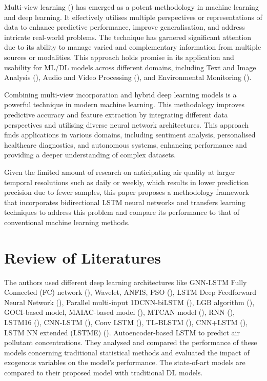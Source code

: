 \documentclass[a4paper, fleqn]{cas-sc}
\theoremstyle{definition}
\theoremstyle{remark}
\begin{document}
Multi-view learning (\cite{zhao2017multi, xu2013survey}) has emerged as a potent methodology in machine learning and deep learning. It effectively utilises multiple perspectives or representations of data to enhance predictive performance,  improve generalisation,  and address intricate real-world problems. The technique has garnered significant attention due to its ability to manage varied and complementary information from multiple sources or modalities. This approach holds promise in its application and usability for ML/DL models across different domains,  including Text and Image Analysis (\cite{yang2020image, nie2017auto}),  Audio and Video Processing (\cite{garcia2018multi, hussain2021comprehensive}),  and Environmental Monitoring (\cite{huang2017multi}).

Combining multi-view incorporation and hybrid deep learning models is a powerful technique in modern machine learning. This methodology improves predictive accuracy and feature extraction by integrating different data perspectives and utilising diverse neural network architectures. This approach finds applications in various domains, including sentiment analysis, personalised healthcare diagnostics, and autonomous systems, enhancing performance and providing a deeper understanding of complex datasets.


Given the limited amount of research on anticipating air quality at larger temporal resolutions such as daily or weekly,  which results in lower prediction precision due to fewer samples,  this paper proposes a methodology framework that incorporates bidirectional LSTM neural networks and transfers learning techniques to address this problem and compare its performance to that of conventional machine learning methods.


\section{Review of Literatures}

The authors used different deep learning architectures like GNN-LSTM Fully Connected (FC) network (\cite{li2023nested}),  Wavelet,  ANFIS,  PSO (\cite{pruthi2022low}),  LSTM Deep Feedforward Neural Network (\cite{menares2021forecasting}),  Parallel multi-input 1DCNN-biLSTM (\cite{zhu2023deep}),  LGB algorithm (\cite{kim2022short}),  GOCI-based model,  MAIAC-based model (\cite{lee2021potential}),  MTCAN model (\cite{samal2021multi}),  RNN (\cite{kurnaz2022prediction}),  LSTM16 (\cite{das2022prediction}),  CNN-LSTM (\cite{natsagdorj2023prediction}),  Conv LSTM (\cite{zhu2023deep}),  TL-BLSTM (\cite{ma2019improving}),  CNN+LSTM (\cite{qin2019novel}),  LSTM NN extended (LSTME) (\cite{li2017long}). Autoencoder-based LSTM to predict air pollutant concentrations. They analysed and compared the performance of these models concerning traditional statistical methods and evaluated the impact of exogenous variables on the model's performance. The state-of-art models are compared to their proposed model with traditional DL models.
\end{document}
